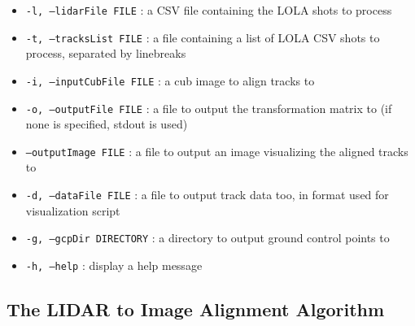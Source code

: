 \begin{itemize}
	\item{\texttt{-l, --lidarFile FILE}} : a CSV file containing the LOLA shots to process
	\item{\texttt{-t, --tracksList FILE}} : a file containing a list of LOLA CSV shots to process, separated by linebreaks
	\item{\texttt{-i, --inputCubFile FILE}} : a cub image to align tracks to
	\item{\texttt{-o, --outputFile FILE}} : a file to output the transformation matrix to (if none is specified, stdout is used)
	\item{\texttt{--outputImage FILE}} : a file to output an image visualizing the aligned tracks to
	\item{\texttt{-d, --dataFile FILE}} : a file to output track data too, in format used for visualization script
	\item{\texttt{-g, --gcpDir DIRECTORY}} : a directory to output ground control points to
	\item{\texttt{-h, --help}} : display a help message
\end{itemize}

\subsection{The LIDAR to Image Alignment Algorithm}


